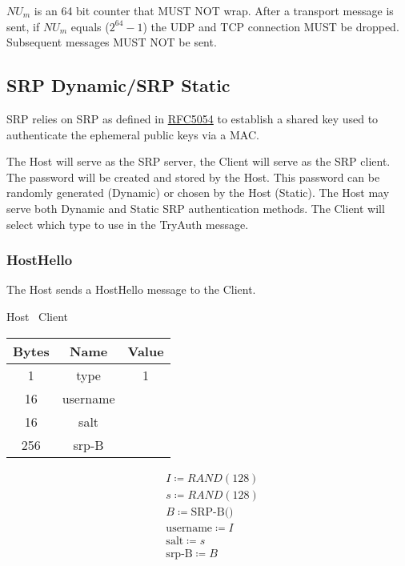$\mathit{NU}_{m}$ is an 64 bit counter that MUST NOT wrap. After a transport message is sent, if $\mathit{NU}_{m}$ equals
($2^{64}-1$) the UDP and TCP connection MUST be dropped. Subsequent messages MUST NOT be sent. \\

\subsection{SRP Dynamic/SRP Static}

SRP relies on SRP as defined in \href{https://datatracker.ietf.org/doc/html/rfc5054}{RFC5054} to establish a
shared key used to authenticate the ephemeral public keys via a MAC.

The Host will serve as the SRP server, the Client will serve as the SRP client.
The password will be created and stored by the Host.
This password can be randomly generated (Dynamic) or chosen by the Host (Static).
The Host may serve both Dynamic and Static SRP authentication methods.
The Client will select which type to use in the TryAuth message.
\\

\subsubsection{HostHello}

The Host sends a HostHello message to the Client.

\begin{center}
    Host \textrightarrow\ Client\\
    \begin{tabular}{|c|c|c|}
        \hline
        \textbf{Bytes} & \textbf{Name} & \textbf{Value} \\
        \hline
        1              & type          & 1              \\
        \hline
        16             & username      &                \\
        \hline
        16             & salt          &                \\
        \hline
        256            & srp-B         &                \\
        \hline
    \end{tabular}
\end{center}

\begin{align*}
    & I \coloneqq RAND(128)\\
    & s \coloneqq RAND(128)\\
    & B \coloneqq \text{SRP-B()}\\
    & \text{username} \coloneqq I\\
    & \text{salt} \coloneqq s\\
    & \text{srp-B} \coloneqq B\\
\end{align*}

